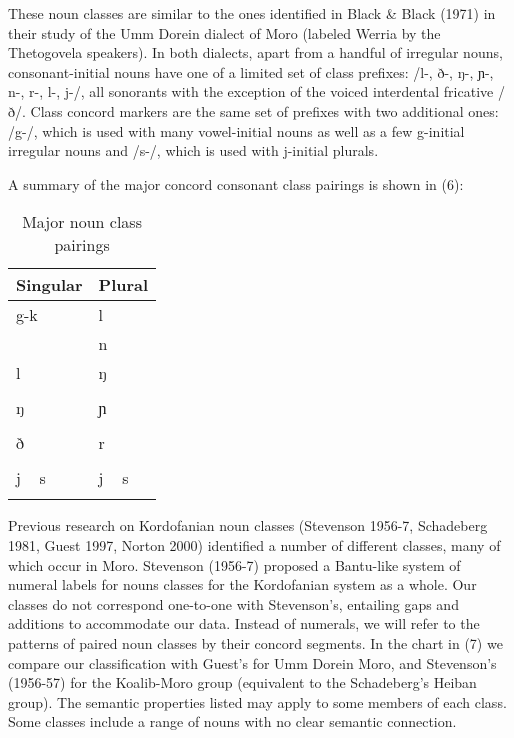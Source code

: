 These noun classes are similar to the ones identified in Black \& Black (1971) in their study of the Umm Dorein dialect of Moro (labeled Werria by the Thetogovela speakers). In both dialects, apart from a handful of irregular nouns, consonant-initial nouns have one of a limited set of class prefixes: /l-, ð-, ŋ-, ɲ-, n-, r-, l-, j-/, all sonorants with the exception of the voiced interdental fricative /ð/. Class concord markers are the same set of prefixes with two additional ones: /g-/, which is used with many vowel-initial nouns as well as a few g-initial irregular nouns and /s-/, which is used with j-initial plurals. 

A summary of the major concord consonant class pairings is shown in (6):

\begin{table} %
  \begin{tabular}{ll}
    \lsptoprule
Singular & Plural \\
\midrule
g-k		&	l\\
		&		n\\
	l	&		ŋ\\
		&	\\
	ŋ	&		ɲ\\
		&\\
	ð	&		r\\
		&\\
	j ~ s		&	j ~ s\\
\lspbottomrule 
  \end{tabular}
  \caption{Major noun class pairings}
  \label{tab:ch6:3}
\end{table}

Previous research on Kordofanian noun classes (Stevenson 1956-7, Schadeberg 1981, Guest 1997, Norton 2000) identified a number of different classes, many of which occur in Moro. Stevenson (1956-7) proposed a Bantu-like system of numeral labels for nouns classes for the Kordofanian system as a whole. Our classes do not correspond one-to-one with Stevenson’s, entailing gaps and additions to accommodate our data. Instead of numerals, we will refer to the patterns of paired noun classes by their concord segments.  In the chart in (7) we compare our classification with Guest’s for Umm Dorein Moro, and Stevenson’s (1956-57) for the Koalib-Moro group (equivalent to the Schadeberg’s Heiban group). The semantic properties listed may apply to some members of each class. Some classes include a range of nouns with no clear semantic connection.


